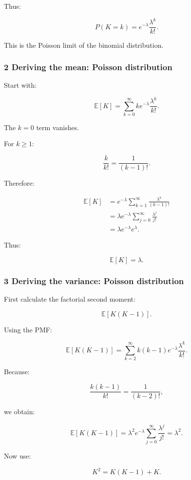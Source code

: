 Thus:

\[
 \boxed{ P(K=k)=e^{-\lambda}\frac{\lambda^k}{k!} }.
\]

This is the Poisson limit of the binomial distribution.

\subsubsection{2 Deriving the mean: Poisson distribution}\label{02-foundations-ii-ch024-deriving-the-mean-poisson-distribution}

Start with:

\[
 \mathbb E[K] = \sum_{k=0}^\infty k e^{-\lambda}\frac{\lambda^k}{k!}.
\]

The \(k=0\) term vanishes.

For \(k\ge1\):

\[
 \frac{k}{k!}=\frac1{(k-1)!}.
\]

Therefore:

\[
 \begin{aligned} \mathbb E[K] &= e^{-\lambda} \sum_{k=1}^\infty \frac{\lambda^k}{(k-1)!}\\ &= \lambda e^{-\lambda} \sum_{j=0}^\infty \frac{\lambda^j}{j!}\\ &=\lambda e^{-\lambda}e^\lambda. \end{aligned}
\]

Thus:

\[
 \boxed{\mathbb E[K]=\lambda}.
\]

\subsubsection{3 Deriving the variance: Poisson distribution}\label{02-foundations-ii-ch024-deriving-the-variance-poisson-distribution}

First calculate the factorial second moment:

\[
 \mathbb E[K(K-1)].
\]

Using the PMF:

\[
 \mathbb E[K(K-1)] = \sum_{k=2}^\infty k(k-1)e^{-\lambda} \frac{\lambda^k}{k!}.
\]

Because:

\[
 \frac{k(k-1)}{k!}=\frac1{(k-2)!},
\]

we obtain:

\[
 \mathbb E[K(K-1)] = \lambda^2e^{-\lambda} \sum_{j=0}^{\infty}\frac{\lambda^j}{j!} =\lambda^2.
\]

Now use:

\[
 K^2=K(K-1)+K.
\]

